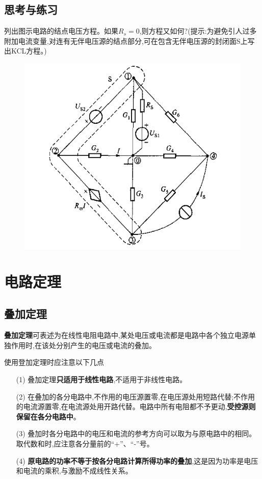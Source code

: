 \documentclass[11pt,a4paper,oneside]{book}
\begin{document}
\section{思考与练习}
列出图示电路的结点电压方程。如果$R_s=0$,则方程又如何?(提示:为避免引人过多附加电流变量,对连有无伴电压源的结点部分,可在包含无伴电压源的封闭面S上写出KCL方程。)
\begin{figure}[H]
	\centering
	\includegraphics[width=0.7\linewidth]{screenshot077}
	\caption{}
	\label{fig:screenshot077}
\end{figure}




\chapter{电路定理}
\section{叠加定理}
\textbf{叠加定理}可表述为在线性电阻电路中,某处电压或电流都是电路中各个独立电源单独作用时,在该处分别产生的电压或电流的叠加。

使用登加定理时应注意以下几点
\begin{enumerate}\setlength{\itemsep}{0.2pt}
	\item[(1)] 叠加定理\textbf{只适用于线性电路},不适用于非线性电路。
	\item[(2)] 在叠加的各分电路中,不作用的电压源置零,在电压源处用短路代替;不作用的电流源置零,在电流源处用开路代替。电路中所有电阻都不予更动,\textbf{受控源则保留在各分电路中}。
	\item[(3)] 叠加时各分电路中的电压和电流的参考方向可以取为与原电路中的相同。取代数和时,应注意各分量前的“+”、“-”号。
	\item[(4)] \textbf{原电路的功率不等于按各分电路计算所得功率的叠加},这是因为功率是电压和电流的乘积,与激励不成线性关系。
\end{enumerate}
\end{document}
